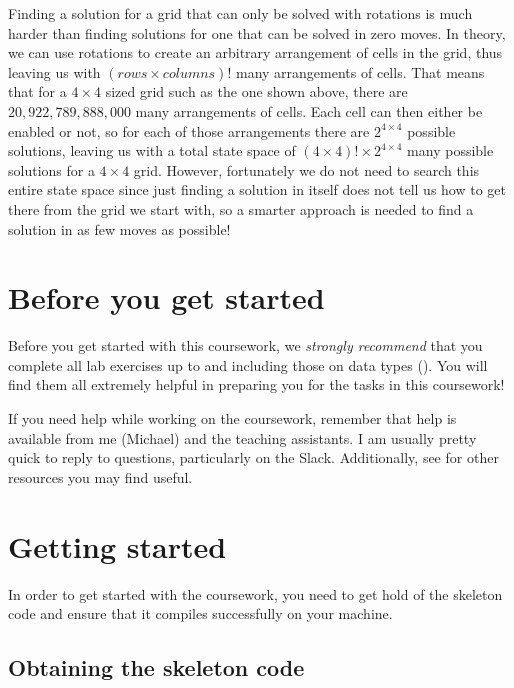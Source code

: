 Finding a solution for a grid that can only be solved with rotations is much harder than finding solutions for one that can be solved in zero moves. In theory, we can use rotations to create an arbitrary arrangement of cells in the grid, thus leaving us with $(\mathit{rows} \times \mathit{columns})!$ many arrangements of cells. That means that for a $4 \times 4$ sized grid such as the one shown above, there are $20,922,789,888,000$ many arrangements of cells. Each cell can then either be enabled or not, so for each of those arrangements there are $2^{4 \times 4}$ possible solutions, leaving us with a total state space of $(4 \times 4)! \times 2^{4 \times 4}$ many possible solutions for a $4 \times 4$ grid. However, fortunately we do not need to search this entire state space since just finding a solution in itself does not tell us how to get there from the grid we start with, so a smarter approach is needed to find a solution in as few moves as possible!


\section{Before you get started}
\label{sec:cswk1-before-you-start}

Before you get started with this coursework, we \emph{strongly recommend} that you complete all lab exercises up to and including those on data types (). You will find them all extremely helpful in preparing you for the tasks in this coursework!

If you need help while working on the coursework, remember that help is available from me (Michael) and the teaching assistants. I am usually pretty quick to reply to questions, particularly on the Slack. Additionally, see  for other resources you may find useful.


\section{Getting started}
\label{sec:cswk1-getting-started}

In order to get started with the coursework, you need to get hold of the skeleton code and ensure that it compiles successfully on your machine. 

\subsection{Obtaining the skeleton code}

